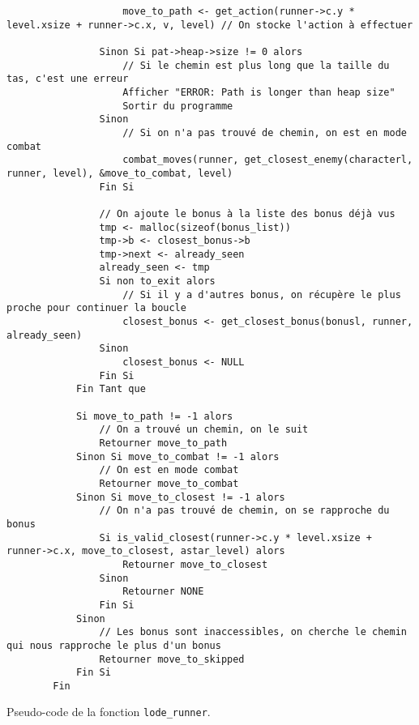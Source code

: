 \begin{longlisting}
\begin{verbatim}
                    move_to_path <- get_action(runner->c.y * level.xsize + runner->c.x, v, level) // On stocke l'action à effectuer

                Sinon Si pat->heap->size != 0 alors
                    // Si le chemin est plus long que la taille du tas, c'est une erreur
                    Afficher "ERROR: Path is longer than heap size"
                    Sortir du programme
                Sinon
                    // Si on n'a pas trouvé de chemin, on est en mode combat
                    combat_moves(runner, get_closest_enemy(characterl, runner, level), &move_to_combat, level)
                Fin Si

                // On ajoute le bonus à la liste des bonus déjà vus
                tmp <- malloc(sizeof(bonus_list))
                tmp->b <- closest_bonus->b
                tmp->next <- already_seen
                already_seen <- tmp
                Si non to_exit alors
                    // Si il y a d'autres bonus, on récupère le plus proche pour continuer la boucle
                    closest_bonus <- get_closest_bonus(bonusl, runner, already_seen)
                Sinon
                    closest_bonus <- NULL
                Fin Si
            Fin Tant que

            Si move_to_path != -1 alors
                // On a trouvé un chemin, on le suit
                Retourner move_to_path
            Sinon Si move_to_combat != -1 alors
                // On est en mode combat
                Retourner move_to_combat
            Sinon Si move_to_closest != -1 alors
                // On n'a pas trouvé de chemin, on se rapproche du bonus
                Si is_valid_closest(runner->c.y * level.xsize + runner->c.x, move_to_closest, astar_level) alors
                    Retourner move_to_closest
                Sinon
                    Retourner NONE
                Fin Si
            Sinon
                // Les bonus sont inaccessibles, on cherche le chemin qui nous rapproche le plus d'un bonus
                Retourner move_to_skipped
            Fin Si
        Fin
    \end{verbatim}
    \caption{Pseudo-code de la fonction \texttt{lode\_runner}.}
    \label{listing:c-lode_runner}
\end{longlisting}